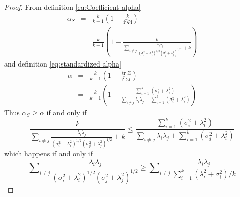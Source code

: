 \documentclass[twoside]{article}
\DeclareMathOperator{\tr}{tr}
\DeclareMathOperator{\tsum}{\textstyle \sum}
\renewcommand{\sqrt}[1]{{(#1)^{1/2}}}
\begin{document}
\begin{proof}
From definition \eqref{eq:Coefficient alpha}
\begin{eqnarray*}
\alpha_S & = & \frac{k}{k-1}\left(1-\frac{k}{\mathbf{i}^{T}\Phi\mathbf{i}}\right)\\
 & = & \frac{k}{k-1}\left(1-\frac{k}{\tsum_{i\neq j}\frac{\lambda_{i}\lambda_{j}}{\sqrt{\sigma_{i}^{2}+\lambda_{i}^{2}}\sqrt{\sigma_{j}^{2}+\lambda_{j}^{2}}}+k}\right)
\end{eqnarray*}
and definition \eqref{eq:standardized alpha}
\begin{eqnarray*}
\alpha & = & \frac{k}{k-1}\left(1-\frac{\tr\Sigma}{\mathbf{i}^{T}\Sigma\mathbf{i}}\right)\\
 & = & \frac{k}{k-1}\left(1-\frac{\tsum_{i=1}^{k}(\sigma_{i}^{2}+\lambda_{i}^{2})}{\tsum_{i\neq j}\lambda_{i}\lambda_{j}+\tsum_{i=1}^{k}(\sigma_{i}^{2}+\lambda_{i}^{2})}\right)
\end{eqnarray*}
Thus $\alpha_S\geq\alpha$ if and only if
\[
\frac{k}{\tsum_{i\neq j}\frac{\lambda_{i}\lambda_{j}}{\sqrt{\sigma_{i}^{2}+\lambda_{i}^{2}}\sqrt{\sigma_{j}^{2}+\lambda_{j}^{2}}}+k}\leq\frac{\tsum_{i=1}^{k}(\sigma_{i}^{2}+\lambda_{i}^{2})}{\tsum_{i\neq j}\lambda_{i}\lambda_{j}+\tsum_{i=1}^{k}(\sigma_{i}^{2}+\lambda_{i}^{2})}
\]
which happens if and only if 
\[
\tsum_{i\neq j}\frac{\lambda_{i}\lambda_{j}}{\sqrt{\sigma_{i}^{2}+\lambda_{i}^{2}}\sqrt{\sigma_j^{2}+\lambda_{j}^{2}}}\geq\tsum_{i\neq j}\frac{\lambda_{i}\lambda_{j}}{\tsum_{i=1}^{k}(\lambda_{i}^{2}+\sigma_{i}^{2})/k}
\]
\end{proof}
\end{document}
